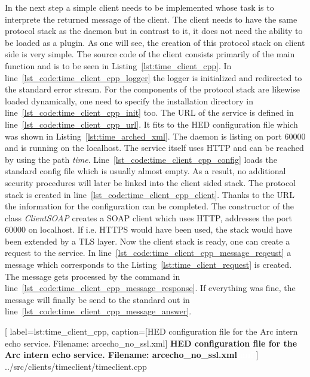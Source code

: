 In the next step a simple client needs to be implemented whose task is to interprete the returned message of the client.
The client needs to have the same protocol stack as the daemon but in contrast to it, it does not need the ability to be loaded as a plugin. As one will see, the creation of this protocol stack on client side is very simple.
The source code of the client consists primarily of the main function and is to be seen in Listing~\ref{lst:time_client_cpp}.
In line~\ref{lst_code:time_client_cpp_logger} the logger is initialized and redirected to the standard error stream.
For the components of the protocol stack are likewise loaded dynamically, one need to specify the installation directory in line~\ref{lst_code:time_client_cpp_init} too.
The URL of the service is defined in line~\ref{lst_code:time_client_cpp_url}. It fits to the HED configuration file which was shown in Listing~\ref{lst:time_arched_xml}. The daemon is listing on port 60000 and is running on the localhost. The service itself uses HTTP and can be reached by using the path \textit{time}.
Line~\ref{lst_code:time_client_cpp_config} loads the standard config file which is usually almost empty. As a result, no additional security procedures will later be linked into the client sided stack. The protocol stack is created in line~\ref{lst_code:time_client_cpp_client}. Thanks to the URL the information for the configuration can be completed.
The constructor of the class \textit{ClientSOAP} creates a SOAP client which uses HTTP, addresses the port 60000 on localhost. If i.e. HTTPS would have been used, the stack would have been extended by a TLS layer.
Now the client stack is ready, one can create a request to the service. In line~\ref{lst_code:time_client_cpp_message_reqeust} a message which corresponds to the Listing~\ref{lst:time_client_request} is created. The message gets processed by the command in line~\ref{lst_code:time_client_cpp_message_response}. If everything was fine, the message will finally be send to the standard out in line~\ref{lst_code:time_client_cpp_message_answer}.


	[
	label=lst:time_client_cpp,
	caption={[HED configuration file for the Arc intern echo service. Filename: arcecho\_no\_ssl.xml]
	\textbf{HED configuration file for the Arc intern echo service. Filename: arcecho\_no\_ssl.xml\textcolor{white}{hmf}}}
	]
{../src/clients/timeclient/timeclient.cpp}






